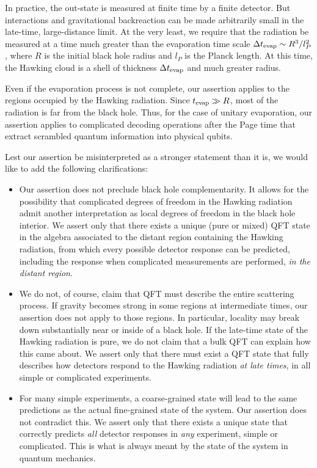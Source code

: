 \documentclass[12pt,letterpaper]{article}
\begin{document}
In practice, the out-state is measured at finite time by a finite detector. But interactions and gravitational backreaction can be made arbitrarily small in the late-time, large-distance limit. At the very least, we require that the radiation be measured at a time much greater than the evaporation time scale $\Delta t_{\rm evap}\sim R^3/l_P^2$, where $R$ is the initial black hole radius and $l_P$ is the Planck length. At this time, the Hawking cloud is a shell of thickness $\Delta t_{\rm evap}$ and much greater radius.

Even if the evaporation process is not complete, our assertion applies to the regions occupied by the Hawking radiation. Since $t_{\rm evap}\gg R$, most of the radiation is far from the black hole. Thus, for the case of unitary evaporation, our assertion applies to complicated decoding operations after the Page time that extract scrambled quantum information into physical qubits.

Lest our assertion be misinterpreted as a stronger statement than it is, we would like to add the following clarifications:
\begin{itemize}
\item Our assertion does not preclude black hole complementarity. It allows for the possibility that complicated degrees of freedom in the Hawking radiation admit another interpretation as local degrees of freedom in the black hole interior. We assert only that there exists a unique (pure or mixed) QFT state in the algebra associated to the distant region containing the Hawking radiation, from which every possible detector response can be predicted, including the response when complicated measurements are performed, {\em in the distant region}.
\item We do not, of course, claim that QFT must describe the entire scattering process. If gravity becomes strong in some regions at intermediate times, our assertion does not apply to those regions. In particular, locality may break down substantially near or inside of a black hole. If the late-time state of the Hawking radiation is pure, we do not claim that a bulk QFT can explain how this came about. We assert only that there must exist a QFT state that fully describes how detectors respond to the Hawking radiation {\em at late times}, in all simple or complicated experiments.
\item For many simple experiments, a coarse-grained state will lead to the same predictions as the actual fine-grained state of the system. Our assertion does not contradict this. We assert only that there exists a unique state that correctly predicts {\em all} detector responses in {\em any} experiment, simple or complicated. This is what is always meant by the state of the system in quantum mechanics.
\end{itemize}
\end{document}
